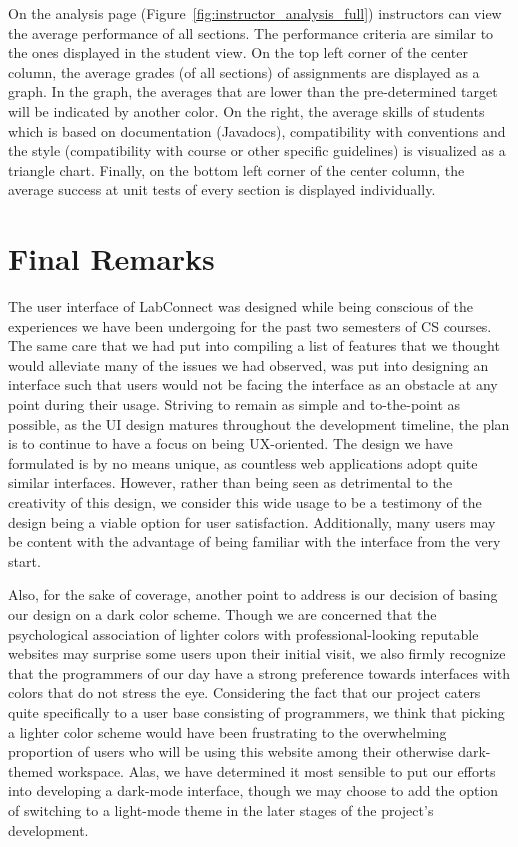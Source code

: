 \documentclass[a4paper, 12pt]{article}
\begin{document}
    On the analysis page (Figure~\ref{fig:instructor_analysis_full}) instructors can view the average performance of all sections. The performance criteria are similar to the ones displayed in the student view.
    On the top left corner of the center column, the average grades (of all sections) of assignments are displayed as a graph. In the graph, the averages that are lower than the
    pre-determined target will be indicated by another color. On the right, the average skills of students which is based on documentation (Javadocs), compatibility with
    conventions and the style (compatibility with course or other specific guidelines) is visualized as a triangle chart. Finally, on the bottom left corner of the center column, the average
    success at unit tests of every section is displayed individually.


    \pagebreak

    \section{Final Remarks}

    The user interface of LabConnect was designed while being conscious of the experiences we have been undergoing for the past two semesters of CS courses.
    The same care that we had put into compiling a list of features that we thought would alleviate many of the issues we had observed,
    was put into designing an interface such that users would not be facing the interface as an obstacle at any point during their usage.
    Striving to remain as simple and to-the-point as possible, as the UI design matures throughout the development timeline, the plan is
    to continue to have a focus on being UX-oriented. The design we have formulated is by no means unique, as countless web applications adopt
    quite similar interfaces. However, rather than being seen as detrimental to the creativity of this design, we consider this wide usage
    to be a testimony of the design being a viable option for user satisfaction. Additionally, many users may be content with the advantage of
    being familiar with the interface from the very start.

    Also, for the sake of coverage, another point to address is our decision of basing our design on a dark color scheme. Though we are concerned that the psychological association of
    lighter colors with professional-looking reputable websites may surprise some users upon their initial visit, we also firmly recognize that the programmers
    of our day have a strong preference towards interfaces with colors that do not stress the eye. Considering the fact that our project caters quite specifically to
    a user base consisting of programmers, we think that picking a lighter color scheme would have been frustrating to the overwhelming proportion of users who will
    be
    using this website among their otherwise dark-themed workspace.
    Alas, we have determined it most sensible to put our efforts into developing a dark-mode interface, though we may choose to add the option of switching
    to a light-mode theme in the later stages of the project's development.
\end{document}
